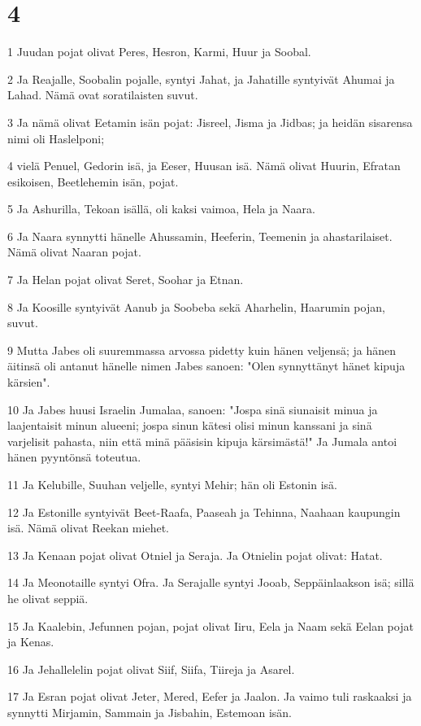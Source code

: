 \chapter{4}

\par 1 Juudan pojat olivat Peres, Hesron, Karmi, Huur ja Soobal.
\par 2 Ja Reajalle, Soobalin pojalle, syntyi Jahat, ja Jahatille syntyivät Ahumai ja Lahad. Nämä ovat soratilaisten suvut.
\par 3 Ja nämä olivat Eetamin isän pojat: Jisreel, Jisma ja Jidbas; ja heidän sisarensa nimi oli Haslelponi;
\par 4 vielä Penuel, Gedorin isä, ja Eeser, Huusan isä. Nämä olivat Huurin, Efratan esikoisen, Beetlehemin isän, pojat.
\par 5 Ja Ashurilla, Tekoan isällä, oli kaksi vaimoa, Hela ja Naara.
\par 6 Ja Naara synnytti hänelle Ahussamin, Heeferin, Teemenin ja ahastarilaiset. Nämä olivat Naaran pojat.
\par 7 Ja Helan pojat olivat Seret, Soohar ja Etnan.
\par 8 Ja Koosille syntyivät Aanub ja Soobeba sekä Aharhelin, Haarumin pojan, suvut.
\par 9 Mutta Jabes oli suuremmassa arvossa pidetty kuin hänen veljensä; ja hänen äitinsä oli antanut hänelle nimen Jabes sanoen: "Olen synnyttänyt hänet kipuja kärsien".
\par 10 Ja Jabes huusi Israelin Jumalaa, sanoen: "Jospa sinä siunaisit minua ja laajentaisit minun alueeni; jospa sinun kätesi olisi minun kanssani ja sinä varjelisit pahasta, niin että minä pääsisin kipuja kärsimästä!" Ja Jumala antoi hänen pyyntönsä toteutua.
\par 11 Ja Kelubille, Suuhan veljelle, syntyi Mehir; hän oli Estonin isä.
\par 12 Ja Estonille syntyivät Beet-Raafa, Paaseah ja Tehinna, Naahaan kaupungin isä. Nämä olivat Reekan miehet.
\par 13 Ja Kenaan pojat olivat Otniel ja Seraja. Ja Otnielin pojat olivat: Hatat.
\par 14 Ja Meonotaille syntyi Ofra. Ja Serajalle syntyi Jooab, Seppäinlaakson isä; sillä he olivat seppiä.
\par 15 Ja Kaalebin, Jefunnen pojan, pojat olivat Iiru, Eela ja Naam sekä Eelan pojat ja Kenas.
\par 16 Ja Jehallelelin pojat olivat Siif, Siifa, Tiireja ja Asarel.
\par 17 Ja Esran pojat olivat Jeter, Mered, Eefer ja Jaalon. Ja vaimo tuli raskaaksi ja synnytti Mirjamin, Sammain ja Jisbahin, Estemoan isän.
